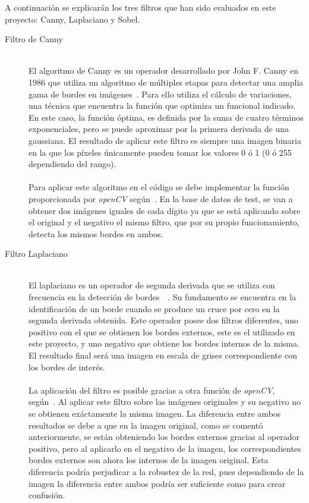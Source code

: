 A continuación se explicarán los tres filtros que han sido evaluados en este proyecto: Canny, Laplaciano y Sobel.
\vspace{10pt}
\begin{description}
	\item[Filtro de Canny] \hfill 
	\vspace{5pt}
	\\
	El algoritmo de Canny es un operador desarrollado por John F. Canny en 1986 que utiliza un algoritmo de múltiples etapas para detectar una amplia gama de bordes en imágenes~\cite{4767851}. Para ello utiliza el cálculo de variaciones, una técnica que encuentra la función que optimiza un funcional indicado. En este caso, la función óptima, es definida por la suma de cuatro términos exponenciales, pero se puede aproximar por la primera derivada de una gaussiana. El resultado de aplicar este filtro es siempre una imagen binaria en la que los píxeles únicamente pueden tomar los valores 0 ó 1 (0 ó 255 dependiendo del rango).\\
	\vspace{-10pt}
	\\
	Para aplicar este algoritmo en el código se debe implementar la función proporcionada por \textit{openCV} según~\cite{cannyOCV}. En la base de datos de test, se van a obtener dos imágenes iguales de cada dígito ya que se está aplicando sobre el original y el negativo el mismo filtro, que por su propio funcionamiento, detecta los mismos bordes en ambos.
	\vspace{10pt}
	\item[Filtro Laplaciano] \hfill 
	\vspace{5pt}
	\\
	El laplaciano es un operador de segunda derivada que se utiliza con frecuencia en la detección de bordes~\cite{laplacian}~\cite{gonzalez2008digital}. Su fundamento se encuentra en la identificación de un borde cuando se produce un cruce por cero en la segunda derivada obtenida. Este operador posee dos filtros diferentes, uno positivo con el que se obtienen los bordes externos, este es el utilizado en este proyecto, y uno negativo que obtiene los bordes internos de la misma. El resultado final será una imagen en escala de grises correspondiente con los bordes de interés.\\
	\vspace{-10pt}
	\\
	La aplicación del filtro es posible gracias a otra función de \textit{openCV}, según~\cite{laplacianOCV}. Al aplicar este filtro sobre las imágenes originales y su negativo no se obtienen exáctamente la misma imagen. La diferencia entre ambos resultados se debe a que en la imagen original, como se comentó anteriormente, se están obteniendo los bordes externos gracias al operador positivo, pero al aplicarlo en el negativo de la imagen, los correspondientes bordes externos son ahora los internos de la imagen original. Esta diferencia podría perjudicar a la robustez de la red, pues dependiendo de la imagen la diferencia entre ambos podría ser suficiente como para crear confusión.

\end{description}
